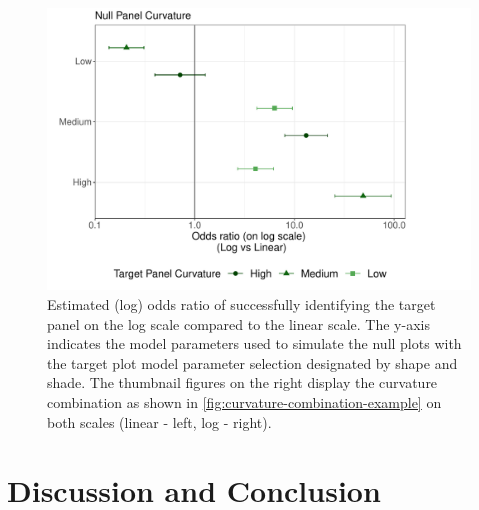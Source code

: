 \documentclass[12pt]{article}
\begin{document}
\begin{figure}[tbp]

{\centering \includegraphics[width=\linewidth,]{logarithmic-lineups-revisions_files/figure-latex/odds-ratio-plot-1} 

}

\caption{Estimated (log) odds ratio of successfully identifying the target panel on the log scale compared to the linear scale. The y-axis indicates the model parameters used to simulate the null plots with the target plot model parameter selection designated by shape and shade. The thumbnail figures on the right display the curvature combination as shown in \cref{fig:curvature-combination-example} on both scales (linear - left, log - right).}\label{fig:odds-ratio-plot}
\end{figure}

\hypertarget{discussion-conclusion}{%
\section{Discussion and Conclusion}\label{discussion-conclusion}}
\end{document}
